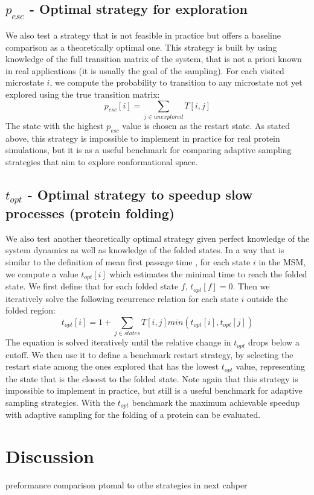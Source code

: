 \subsection{$p_{esc}$ - Optimal strategy for exploration}
We also test a strategy that is not feasible in practice but offers a baseline
comparison as a theoretically optimal one. This strategy is built by using knowledge
of the full transition matrix of the system, that is not a priori known in real
applications (it is usually the goal of the sampling).
For each visited microstate $i$, we
compute the probability to transition to any microstate not yet explored using
the true transition matrix:
%
$$p_{esc}[i]=\sum_{j \in unexplored}T[i, j]$$
%
The state with the highest $p_{esc}$ value is chosen as the restart state. As stated above,
this strategy is impossible to implement in practice for real protein
simulations, but it is as a useful benchmark for comparing adaptive sampling
strategies that aim to explore conformational space.

\subsection{$t_{opt}$ - Optimal strategy to speedup slow processes (protein folding)} 
We also test another theoretically optimal strategy given perfect knowledge of the
system dynamics as well as knowledge of the folded states. In a way that is
similar to the definition of mean first passage time \cite{mfptbook},
for each state $i$ in the MSM, we compute a value $t_{opt}[i]$ which 
estimates the minimal time to reach the folded state.
We first define that for each folded state $f$, $t_{opt}[f] = 0$. Then we
iteratively solve the following recurrence relation for each state $i$ outside the folded region:
%
$$t_{opt}[i]=1+\sum_{j \in states}T[i,j]min(t_{opt}[i],t_{opt}[j])$$
%
The equation is solved iteratively until the relative change in $t_{opt}$ drops
below a cutoff. We then use it to define a benchmark restart strategy, by
selecting the restart state among the ones explored that has the lowest
$t_{opt}$ value, representing the state that is the closest to the folded
state. Note again that this strategy is impossible to implement in
practice, but still is a useful benchmark for adaptive sampling strategies.
With the $t_{opt}$ benchmark the maximum achievable speedup with adaptive
sampling for the folding of a protein can be evaluated.


\section{\label{sec:methods}Discussion}
preformance comparison ptomal to  othe strategies in next cahper




